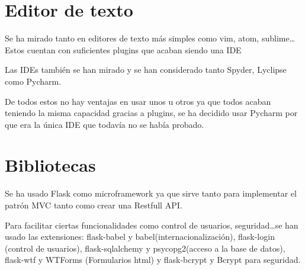 \section{Editor de texto}

Se ha mirado tanto en editores de texto más simples como vim, atom, sublime\ldots Estos cuentan con suficientes plugins que acaban siendo una IDE

Las IDEs también se han mirado y se han considerado tanto Spyder, Lyclipse como Pycharm.

De todos estos no hay ventajas en usar unos u otros ya que todos acaban teniendo la misma capacidad gracias a plugins, se ha decidido usar Pycharm por que era la única IDE que todavía no se había probado.


\section{Bibliotecas}

Se ha usado Flask como microframework ya que sirve tanto para implementar el patrón MVC tanto como crear una Restfull API. 

Para facilitar ciertas funcionalidades como control de usuarios, seguridad\ldots se han usado las extensiones: flask-babel y babel(internacionalización), flask-login (control de usuarios), flask-sqlalchemy y psycopg2(acceso a la base de datos), flask-wtf y WTForms (Formularios html) y flask-bcrypt y Bcrypt para seguridad. 